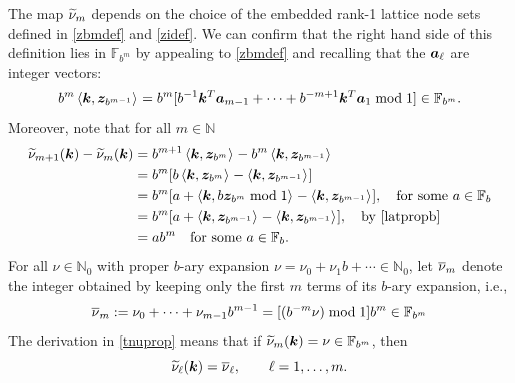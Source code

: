 \documentclass[graybox]{svmult}
\newcommand{\N}{\mathbb{N}} %
\newcommand{\F}{\mathbb{F}} %
\newcommand{\bsz}{\boldsymbol{z}}    %
\begin{document}
The map $\widetilde{\nu}_m$ depends on the choice of the embedded rank-1 lattice node sets defined in \eqref{zbmdef} and \eqref{zidef}.  We can confirm that the right hand side of this definition lies in $\F_{b^m}$ by appealing to  \eqref{zbmdef} and recalling that the $\boldsymbol{a}_\ell$ are integer vectors:
\[
b^{m} \ip{\bsk}{\bsz_{b^{m-1}}} = b^m[b^{-1} \bsk^T\bsa_{m-1} + \cdots + b^{-m+1}\bsk^T \bsa_{1} \bmod 1] \in \F_{b^m}.
\]
Moreover, note that for all $m\in \N$
\begin{align}
\label{tnuprop}
\nonumber
\tnu_{m+1}(\bsk) - \tnu_{m}(\bsk) & = b^{m+1} \ip{\bsk}{\bsz_{b^{m}}} - b^{m} \ip{\bsk}{\bsz_{b^{m-1}}} \\
\nonumber
&=b^{m}[ b\ip{\bsk}{\bsz_{b^{m}}} - \ip{\bsk}{\bsz_{b^{m-1}}}]\\
\nonumber
&=b^{m}[ a + \ip{\bsk}{b\bsz_{b^{m}} \bmod 1}  - \ip{\bsk}{\bsz_{b^{m-1}}}], \quad \text{for some }a \in \F_b \\
\nonumber
&=b^{m}[ a + \ip{\bsk}{\bsz_{b^{m-1}}}  - \ip{\bsk}{\bsz_{b^{m-1}}}], \quad  \text{by \eqref{latpropb}} \\
&=a b^{m} \quad \text{for some }a \in \F_b.
\end{align}
For all $\nu\in \N_0$ with proper $b$-ary expansion $\nu= \nu_0 + \nu_1 b + \cdots \in \N_0$, let $\overline{\nu}_{m}$ denote the integer obtained by keeping only the first $m$ terms of its $b$-ary expansion, i.e., 
\begin{equation}
\label{onudef}
\onu_{m} := \nu_0 + \cdots + \nu_{m-1}b^{m-1} = [(b^{-m} \nu) \bmod 1] b^{m} \in \F_{b^{m}}
\end{equation}
The derivation in \eqref{tnuprop} means that if $\tnu_{m}(\bsk) = \nu \in \F_{b^m}$, then
\[
\widetilde{\nu}_\ell(\boldsymbol{k})=\overline{\nu}_{\ell}, \qquad \ell=1, \ldots, m.
\] 
\end{document}
